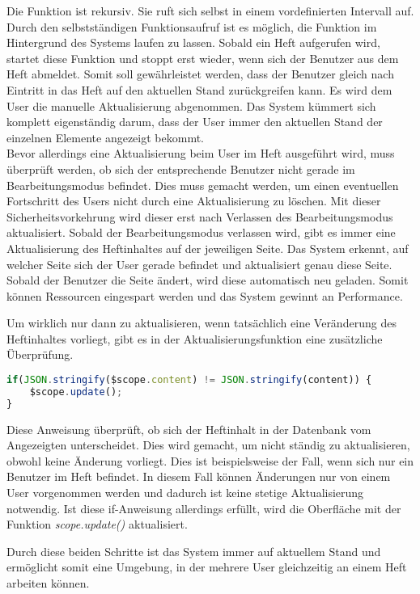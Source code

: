 \newpage

Die Funktion ist rekursiv. Sie ruft sich selbst in einem vordefinierten Intervall auf. Durch den selbstständigen Funktionsaufruf ist es möglich, die Funktion im Hintergrund des Systems laufen zu lassen. Sobald ein Heft aufgerufen wird, startet diese Funktion und stoppt erst wieder, wenn sich der Benutzer aus dem Heft abmeldet. Somit soll gewährleistet werden, dass der Benutzer gleich nach Eintritt in das Heft auf den aktuellen Stand zurückgreifen kann. Es wird dem User die manuelle Aktualisierung abgenommen. Das System kümmert sich komplett eigenständig darum, dass der User immer den aktuellen Stand der einzelnen Elemente angezeigt bekommt. \\
Bevor allerdings eine Aktualisierung beim User im Heft ausgeführt wird, muss überprüft werden, ob sich der entsprechende Benutzer nicht gerade im Bearbeitungsmodus befindet. Dies muss gemacht werden, um einen eventuellen Fortschritt des Users nicht durch eine Aktualisierung zu löschen. Mit dieser Sicherheitsvorkehrung wird dieser erst nach Verlassen des Bearbeitungsmodus aktualisiert. Sobald der Bearbeitungsmodus verlassen wird, gibt es immer eine Aktualisierung des Heftinhaltes auf der jeweiligen Seite. Das System erkennt, auf welcher Seite sich der User gerade befindet und aktualisiert genau diese Seite. Sobald der Benutzer die Seite ändert, wird diese automatisch neu geladen. Somit können Ressourcen eingespart werden und das System gewinnt an Performance.

Um wirklich nur dann zu aktualisieren, wenn tatsächlich eine Veränderung des Heftinhaltes vorliegt, gibt es in der Aktualisierungsfunktion eine zusätzliche Überprüfung. 
\begin{lstlisting}[caption={Synchronisation - PWS}, language=Javascript]
if(JSON.stringify($scope.content) != JSON.stringify(content)) {
	$scope.update();
}
\end{lstlisting}
Diese Anweisung überprüft, ob sich der Heftinhalt in der Datenbank vom Angezeigten unterscheidet. Dies wird gemacht, um nicht ständig zu aktualisieren, obwohl keine Änderung vorliegt. Dies ist beispielsweise der Fall, wenn sich nur ein Benutzer im Heft befindet. In diesem Fall können Änderungen nur von einem User vorgenommen werden und dadurch ist keine stetige Aktualisierung notwendig. Ist diese if-Anweisung allerdings erfüllt, wird die Oberfläche mit der Funktion \textit{scope.update()} aktualisiert.

Durch diese beiden Schritte ist das System immer auf aktuellem Stand und ermöglicht somit eine Umgebung, in der mehrere User gleichzeitig an einem Heft arbeiten können.


